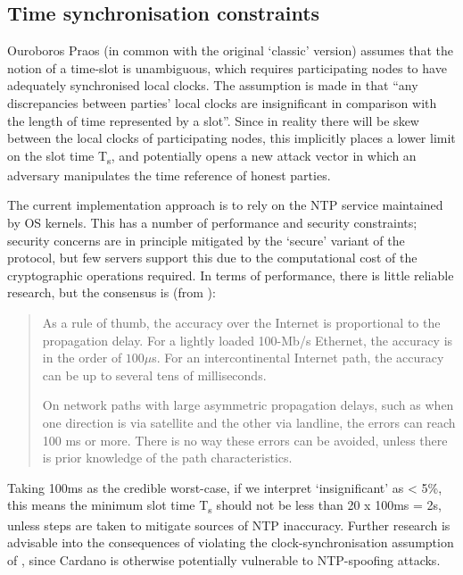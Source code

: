 \documentclass[11pt,a4paper]{article}
\begin{document}
\subsection{Time synchronisation constraints}
\label{time-synchronisation-constraints}

Ouroboros Praos (in common with the original `classic' version) assumes
that the notion of a time-slot is unambiguous, which requires
participating nodes to have adequately synchronised local clocks. The
assumption is made in \cite{BGKR17} that ``any discrepancies between
parties' local clocks are insignificant in comparison with the length of
time represented by a slot''. Since in reality there will be skew
between the local clocks of participating nodes, this implicitly places
a lower limit on the slot time T\textsubscript{s}, and potentially opens
a new attack vector in which an adversary manipulates the time reference
of honest parties.

The current implementation approach is to rely on the NTP service
maintained by OS kernels. This has a number of performance and security
constraints; security concerns are in principle mitigated by the
`secure' variant of the protocol, but few servers support this due to
the computational cost of the cryptographic operations required. In
terms of performance, there is little reliable research, but the
consensus is (from \cite{Mills12}):

\begin{quote}
As a rule of thumb, the accuracy over the Internet is proportional to
the propagation delay. For a lightly loaded 100-Mb/s Ethernet, the
accuracy is in the order of $100 \mu{}$s. For an intercontinental Internet
path, the accuracy can be up to several tens of milliseconds.

On network paths with large asymmetric propagation delays, such as when
one direction is via satellite and the other via landline, the errors
can reach 100 ms or more. There is no way these errors can be avoided,
unless there is prior knowledge of the path characteristics.
\end{quote}

Taking 100ms as the credible worst-case, if we interpret `insignificant'
as \textless{} 5\%, this means the minimum slot time T\textsubscript{s}
should not be less than 20 x 100ms = 2s, unless steps are taken to
mitigate sources of NTP inaccuracy. Further research is advisable into
the consequences of violating the clock-synchronisation assumption of
\cite{BGKR17}, since Cardano is otherwise potentially vulnerable to
NTP-spoofing attacks.
\end{document}

